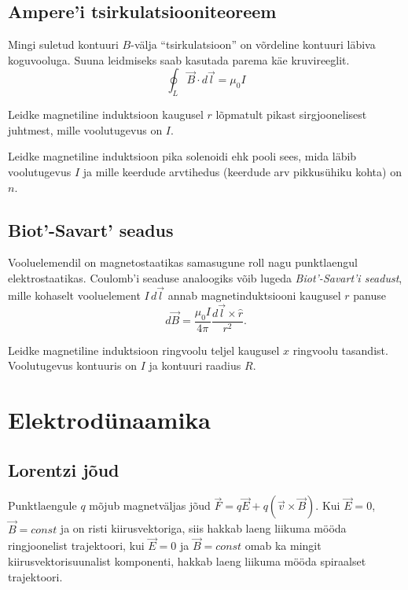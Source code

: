 \documentclass[a4paper,11pt,twocolumn]{article}
\begin{document}
\subsection{Ampere'i tsirkulatsiooniteoreem}

Mingi suletud kontuuri $B$-välja \enquote{tsirkulatsioon} on võrdeline kontuuri läbiva koguvooluga. Suuna leidmiseks saab kasutada parema käe kruvireeglit.
\begin{equation*}
\oint_L\vec{B}\cdot d\vec{l}=\mu_0 I \tag{III Maxwelli võrrand}
\end{equation*}
\begin{question}
	Leidke magnetiline induktsioon kaugusel $r$ lõpmatult pikast sirgjoonelisest juhtmest, mille voolutugevus on $I$.
\end{question}

\begin{question}
	Leidke magnetiline induktsioon pika solenoidi ehk pooli sees, mida läbib voolutugevus $I$ ja mille keerdude arvtihedus (keerdude arv pikkusühiku kohta) on $n$.
\end{question}

\subsection{Biot'-Savart' seadus}
Vooluelemendil on magnetostaatikas samasugune roll nagu punktlaengul elektrostaatikas. Coulomb’i seaduse analoogiks võib lugeda \textit{Biot’-Savart’i seadust}, mille kohaselt vooluelement \( I\, d\vec{l} \) annab magnetinduktsiooni kaugusel \( r \) panuse
\begin{equation}
d\vec{B}=\dfrac{\mu_0 I}{4\pi}\dfrac{d\vec{l} \times \hat{r}}{r^2} \tag{Biot'-Savart' seadus}.
\end{equation}

\begin{question}
	Leidke magnetiline induktsioon ringvoolu teljel kaugusel \( x \) ringvoolu tasandist. Voolutugevus kontuuris on \( I \) ja kontuuri raadius \( R \).
\end{question}

\section{Elektrodünaamika}
\subsection{Lorentzi jõud}
Punktlaengule $q$ mõjub magnetväljas jõud $\vec{F}=q\vec{E}+q(\vec{v}\times \vec{B})$. Kui $\vec{E}=0$, \( \vec{B}=const \) ja on risti kiirusvektoriga, siis hakkab laeng liikuma mööda ringjoonelist trajektoori, kui $\vec{E}=0$ ja $\vec{B}=const$ omab ka mingit kiirusvektorisuunalist komponenti, hakkab laeng liikuma mööda spiraalset trajektoori.
\end{document}
